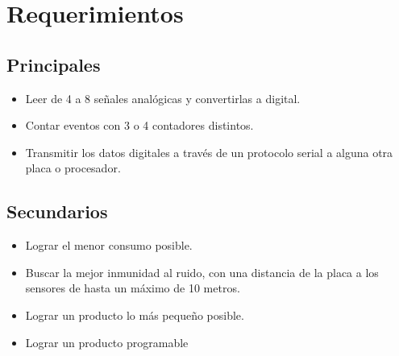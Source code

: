 \section{Requerimientos}
\subsection{Principales}
\begin{itemize}
  \item Leer de 4 a 8 señales analógicas y convertirlas a digital.
  \item Contar eventos con 3 o 4 contadores distintos.
  \item Transmitir los datos digitales a través de un protocolo serial a alguna otra placa o procesador.
\end{itemize}


\subsection{Secundarios}
\begin{itemize}
  \item Lograr el menor consumo posible.
  \item Buscar la mejor inmunidad al ruido, con una distancia de la placa a los sensores de hasta un máximo de 10 metros.
  \item Lograr un producto lo más pequeño posible.
  \item Lograr un producto programable
\end{itemize}